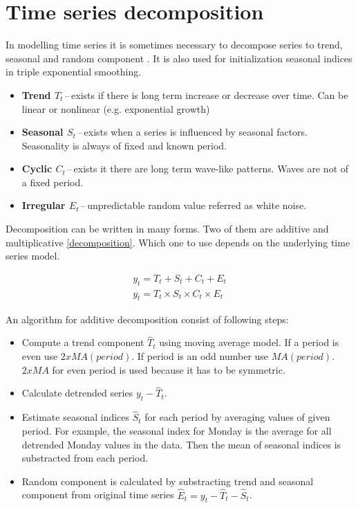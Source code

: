     \section{Time series decomposition}
    In modelling time series it is sometimes necessary to decompose series to trend, seasonal and random component
    \cite{otexts}. It is also used for initialization seasonal indices in triple exponential smoothing.

    \begin{itemize}
        \item \textbf{Trend $ T_{t} $}\,--\,exists if there is long term increase or decrease over
            time. Can be linear or nonlinear (e.g. exponential growth)
        \item \textbf{Seasonal $ S_{t} $}\,--\,exists when a series is influenced by seasonal factors.
            Seasonality is always of fixed and known period.
        \item \textbf{Cyclic $ C_{t} $}\,--\,exists it there are long term wave-like patterns.
            Waves are not of a fixed period.
        \item \textbf{Irregular $ E_{t} $}\,--\,unpredictable random value referred as white
            noise. 
    \end{itemize}

    Decomposition can be written in many forms. Two of them are additive and multiplicative \ref{decomposition}.
    Which one to use depends on the underlying time series model.

    \begin{eqnarray} \label{decomposition}
        y_{t} = T_{t} + S_{t} + C_{t} + E_{t} \\
        y_{t} = T_{t} \times S_{t} \times C_{t} \times E_{t}
    \end{eqnarray}

    An algorithm for additive decomposition consist of following steps:

    \begin{itemize}
        \item Compute a trend component $\hat{T}_t$ using moving average model. If a period is even use
        $2 x MA(period)$. If period is an odd number use $MA(period)$. $2 x MA$ for even period is used because it
        has to be symmetric.
        \item Calculate detrended series $y_t - \hat{T}_t$.
        \item Estimate seasonal indices $\hat{S}_t$ for each period by averaging values of given period. For example,
         the seasonal index for Monday is the average for all detrended Monday values in the data. Then the mean of
         seasonal indices is substracted from each period.
        \item Random component is calculated by substracting trend and seasonal component from original time series
            $\hat{E}_t = y_t - \hat{T}_t - \hat{S}_t$.
    \end{itemize}

